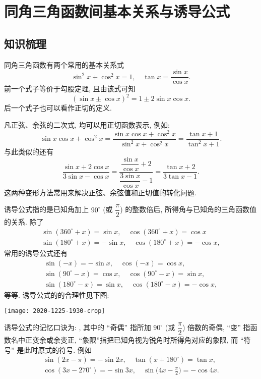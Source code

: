 \section{同角三角函数间基本关系与诱导公式}

\subsection{知识梳理}
同角三角函数有两个常用的基本关系式
\[\sin^2 x+ \cos^2 x= 1,\quad 
    \tan x= \frac{\sin x}{\cos x}.\]
前一个式子等价于勾股定理, 且由该式可知
\[(\sin x\pm \cos x)^2= 1\pm 2\sin x\cos x.\]
后一个式子也可以看作正切的定义.

凡正弦、余弦的二次式, 均可以用正切函数表示, 例如:
\[\sin x\cos x+ \cos^2 x
    = \frac{\sin x\cos x+ \cos^2 x}{\sin^2 x+ \cos^2 x}
    = \frac{\tan x+ 1}{\tan^2 x+ 1}.\]
与此类似的还有
\[\frac{\sin x+2\cos x}{3\sin x-\cos x}
    = \frac{\dfrac{\sin x}{\cos x}+2}{\dfrac{3\sin x}{\cos x}-1}
    = \frac{\tan x+2}{3\tan x-1}.\]
这两种变形方法常用来解决正弦、余弦值和正切值的转化问题.

诱导公式指的是已知角加上 $90^\circ$ (或 $\dfrac{\pi}2$) 的整数倍后,
所得角与已知角的三角函数值的关系. 除了
\[\begin{gathered}
    \sin(360^\circ+x)= \sin x,\quad \cos(360^\circ+x)= \cos x\\
    \sin(180^\circ+x)= -\sin x,\quad \cos(180^\circ+x)= -\cos x,
\end{gathered}\]
常用的诱导公式还有
\[\begin{gathered}
    \sin(-x)= -\sin x,\quad \cos(-x)= \cos x,\\
    \sin(90^\circ-x)= \cos x,\quad \cos(90^\circ-x)= \sin x,\\
    \sin(180^\circ-x)= \sin x,\quad \cos(180^\circ-x)= -\cos x,
\end{gathered}\]
等等. 诱导公式的的合理性见下图:
\begin{center}
    \texttt{[image: 2020-1225-1930-crop]}
\end{center}

诱导公式的记忆口诀为: ,
其中的 ``奇偶'' 指所加 $90^\circ$ (或 $\dfrac{\pi}2$) 倍数的奇偶, 
``变'' 指函数名中正变余或余变正, ``象限''指把已知角视为锐角时所得角对应的象限, 而 ``符号'' 是此时原式的符号. 例如
\[\begin{gathered}
    \sin(2x-\pi)= -\sin2x,\quad \tan(x+180^\circ)= \tan x, \\
    \cos(3x-270^\circ)= -\sin 3x,\quad
    \sin\biggl(4x-\frac{\pi}2\biggr)= -\cos 4x.
\end{gathered}\]

